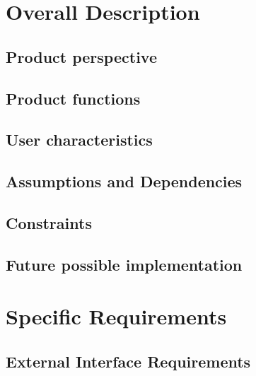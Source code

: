 \documentclass{article}
\begin{document}
	
\newpage
\section{Overall Description}

	\subsection{Product perspective}
	
	
	\subsection{Product functions}
	
	
	\subsection{User characteristics}
	
	
	\subsection{Assumptions and Dependencies}
	
	
	\subsection{Constraints}
	
		
	\subsection{Future possible implementation}
	
	
	
\newpage	    
\section{Specific Requirements}

	\subsection{External Interface Requirements}
	
	
\end{document}
